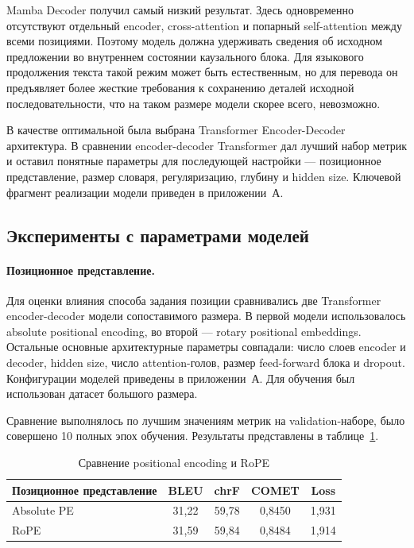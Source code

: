 Mamba Decoder получил самый низкий результат.
Здесь одновременно отсутствуют отдельный encoder, cross-attention и попарный self-attention между всеми позициями.
Поэтому модель должна удерживать сведения об исходном предложении во внутреннем состоянии каузального блока.
Для языкового продолжения текста такой режим может быть естественным, но для перевода он предъявляет более жесткие требования к сохранению деталей исходной последовательности, что на таком размере модели скорее всего, невозможно.

В качестве оптимальной была выбрана Transformer Encoder-Decoder архитектура. В сравнении encoder-decoder Transformer дал лучший набор метрик и оставил понятные параметры для последующей настройки --- позиционное представление, размер словаря, регуляризацию, глубину и hidden size. Ключевой фрагмент реализации модели приведен в приложении~А.

\subsection{Эксперименты с параметрами моделей}

\paragraph{Позиционное представление.}
Для оценки влияния способа задания позиции сравнивались две Transformer encoder-decoder модели сопоставимого размера. В первой модели использовалось absolute positional encoding, во второй --- rotary positional embeddings. Остальные основные архитектурные параметры совпадали: число слоев encoder и decoder, hidden size, число attention-голов, размер feed-forward блока и dropout. Конфигурации моделей приведены в приложении~А. Для обучения был использован датасет большого размера.

Сравнение выполнялось по лучшим значениям метрик на validation-наборе, было совершено 10 полных эпох обучения. Результаты представлены в таблице~\ref{tab:pe-rope-comparison}.

\begin{table}[H]
	\centering
	\caption{Сравнение positional encoding и RoPE}
	\label{tab:pe-rope-comparison}
	\begin{tabular}{|p{}|c|c|c|c|}
		\hline
		\textbf{Позиционное представление} & \textbf{BLEU} & \textbf{chrF} & \textbf{COMET} & \textbf{Loss} \\
		\hline
		Absolute PE                        & 31{,}22       & 59{,}78       & 0{,}8450       & 1{,}931       \\
		\hline
		RoPE                               & 31{,}59       & 59{,}84       & 0{,}8484       & 1{,}914       \\
		\hline
	\end{tabular}
\end{table}

